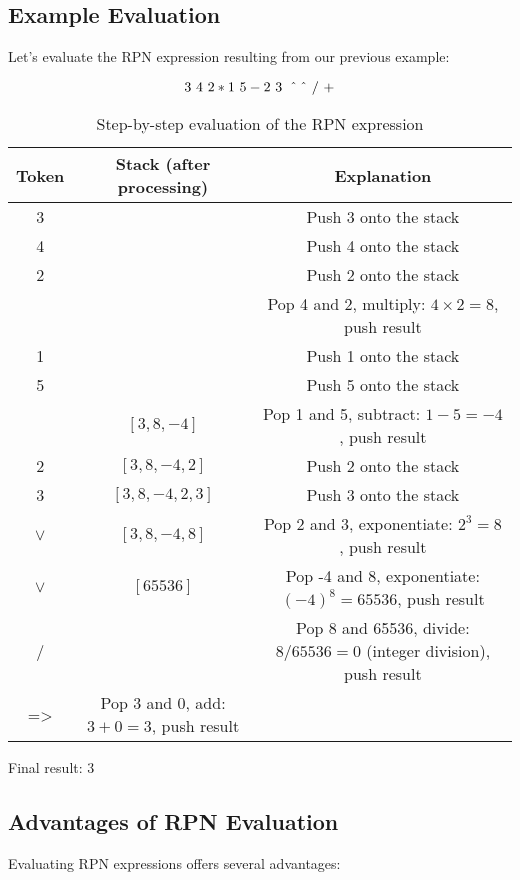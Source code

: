 \documentclass[a4paper,12pt]{article}
\begin{document}
\subsection{Example Evaluation}

Let's evaluate the RPN expression resulting from our previous example: 


\begin{equation*}
    3~4~2 * 1~5 - 2~3~\mathbin{\char`\^} \mathbin{\char`\^} ~/ ~+
\end{equation*}


\begin{table}[h]
\centering
  \begin{tabular}{ccc}
\toprule
\textbf{Token} & \textbf{Stack (after processing)} & \textbf{Explanation} \\
\midrule
3 & & Push 3 onto the stack \\
4 & & Push 4 onto the stack \\
2 & & Push 2 onto the stack \\
& & Pop 4 and 2, multiply: $4 \times 2 = 8$, push result \\
1 & & Push 1 onto the stack \\
5 & & Push 5 onto the stack \\
& $[3, 8, -4]$ & Pop 1 and 5, subtract: $1 - 5 = -4$, push result \\
2 & $[3, 8, -4, 2]$ & Push 2 onto the stack \\
3 & $[3, 8, -4, 2, 3]$ & Push 3 onto the stack \\
$\vee$ & $[3, 8, -4, 8]$ & Pop 2 and 3, exponentiate: $2^3 = 8$, push result \\
$\vee$ & $[65536]$ & Pop -4 and 8, exponentiate: $(-4)^8 = 65536$, push result \\
/ & & Pop 8 and 65536, divide: $8 / 65536 = 0$ (integer division), push result \\
=> & Pop 3 and 0, add: $3 + 0 = 3$, push result \\
\bottomrule
\end{tabular}
\caption{Step-by-step evaluation of the RPN expression}
\label{tab:rpn_evaluation}
\end{table}

Final result: 3

\subsection{Advantages of RPN Evaluation}

Evaluating RPN expressions offers several advantages:
\end{document}
